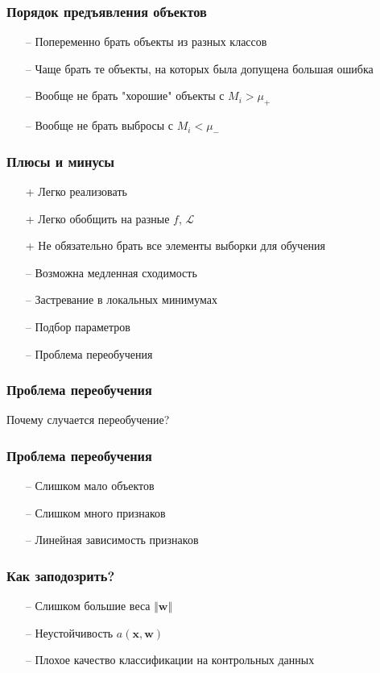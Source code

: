 \documentclass[12pt]{beamer}
\begin{document}
\begin{frame}\frametitle{Порядок предъявления объектов}
\begin{itemize}
\item[--] Попеременно брать объекты из разных классов
\item[--] Чаще брать те объекты, на которых была допущена большая ошибка
\item[--] Вообще не брать "хорошие" объекты с $M_i > \mu_+$
\item[--] Вообще не брать выбросы с $M_i < \mu_-$
\end{itemize}
\end{frame}


\begin{frame}\frametitle{Плюсы и минусы}
\begin{itemize}
\item[+] Легко реализовать
\item[+] Легко обобщить на разные $f$, $\mathcal{L}$
\item[+] Не обязательно брать все элементы выборки для обучения
\end{itemize}
\begin{itemize}
\item[--] Возможна медленная сходимость
\item[--] Застревание в локальных минимумах
\item[--] Подбор параметров
\item[--] Проблема переобучения
\end{itemize}
\end{frame}

\begin{frame}\frametitle{Проблема переобучения}
Почему случается переобучение?
\end{frame}

\begin{frame}\frametitle{Проблема переобучения}
\begin{itemize}
\item[--] Слишком мало объектов
\item[--] Слишком много признаков
\item[--] Линейная зависимость признаков
\end{itemize}
\end{frame}

\begin{frame}\frametitle{Как заподозрить?}
\begin{itemize}
\item[--] Слишком большие веса $\Vert \mathbf{w} \Vert$
\item[--] Неустойчивость $a(\mathbf{x},\mathbf{w})$
\item[--] Плохое качество классификации на контрольных данных
\end{itemize}
\end{frame}
\end{document}
